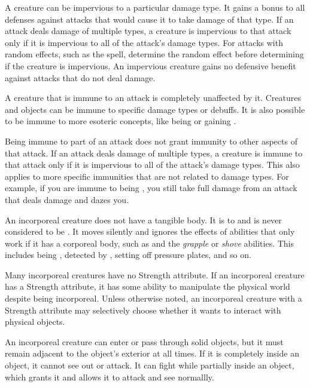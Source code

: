         A creature can be impervious to a particular damage type.
        It gains a  bonus to all defenses against attacks that would cause it to take damage of that type.
        If an attack deals damage of multiple types, a creature is impervious to that attack only if it is impervious to all of the attack's damage types.
        For attacks with random effects, such as the  spell, determine the random effect before determining if the creature is impervious.
        An impervious creature gains no defensive benefit against attacks that do not deal damage.

        A creature that is immune to an attack is completely unaffected by it.
        Creatures and objects can be immune to specific damage types or debuffs.
        It is also possible to be immune to more esoteric concepts, like being \grappled or gaining .

        Being immune to part of an attack does not grant immunity to other aspects of that attack.
        If an attack deals damage of multiple types, a creature is immune to that attack only if it is impervious to all of the attack's damage types.
        This also applies to more specific immunities that are not related to damage types.
        For example, if you are immune to being \dazed, you still take full damage from an attack that deals damage and dazes you.

        An incorporeal creature does not have a tangible body.
        It is  to  and is never considered to be \squeezing.
        It moves silently and ignores the effects of abilities that only work if it has a corporeal body, such as  and the \textit{grapple} or \textit{shove} abilities.
        This includes being \grappled, detected by , setting off pressure plates, and so on.

        Many incorporeal creatures have no Strength attribute.
        If an incorporeal creature has a Strength attribute, it has some ability to manipulate the physical world despite being incorporeal.
        Unless otherwise noted, an incorporeal creature with a Strength attribute may selectively choose whether it wants to interact with physical objects.

        An incorporeal creature can enter or pass through solid objects, but it must remain adjacent to the object's exterior at all times.
        If it is completely inside an object, it cannot see out or attack.
        It can fight while partially inside an object, which grants it  and allows it to attack and see normallly.

